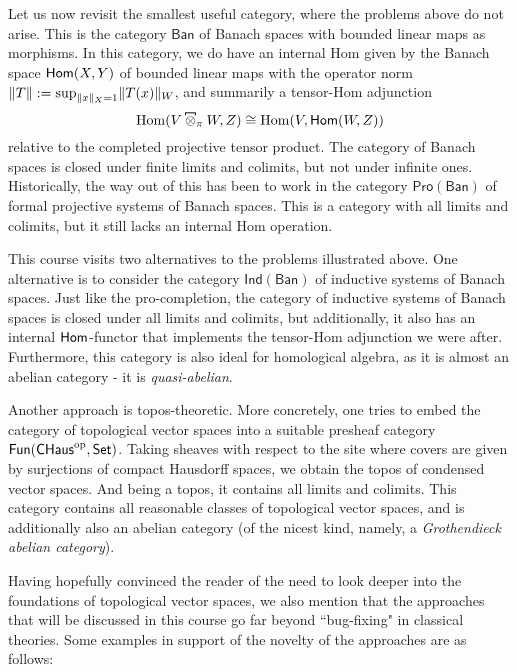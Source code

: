 Let us now revisit the smallest useful category, where the problems above do not arise. This is the category \(\mathsf{Ban}\) of Banach spaces with bounded linear maps as morphisms. In this category, we do have an internal Hom given by the Banach space \(\mathsf{Hom}(X,Y)\) of bounded linear maps with the operator norm \(\lVert T\rVert \mathrel{:=} \sup_{\lVert x\rVert_X = 1} \lVert T(x)\rVert_W\), and summarily a  tensor-Hom adjunction \[\Hom(V \hot_\pi W, Z) \cong \Hom(V, \Home(W,Z))\] relative to the completed projective tensor product. The category of Banach spaces is closed under finite limits and colimits, but not under infinite ones. Historically, the way out of this has been to work in the category \(\mathsf{Pro}(\mathsf{Ban})\) of formal projective systems of Banach spaces. This is a category with all limits and colimits, but it still lacks an internal Hom operation.  


This course visits two alternatives to the problems illustrated above. One alternative is to consider the category \(\mathsf{Ind}(\mathsf{Ban})\) of inductive systems of Banach spaces. Just like the pro-completion, the category of inductive systems of Banach spaces is closed under all limits and colimits, but additionally, it also has an internal \(\mathsf{Hom}\)-functor that implements the tensor-Hom adjunction we were after. Furthermore, this category is also ideal for homological algebra, as it is almost an abelian category - it is \textit{quasi-abelian}.  

Another approach is topos-theoretic. More concretely, one tries to embed the category of topological vector spaces into a suitable presheaf category \(\mathsf{Fun}(\mathsf{CHaus}^{\mathrm{op}}, \mathsf{Set})\). Taking sheaves with respect to the site where covers are given by surjections of compact Hausdorff spaces, we obtain the topos of condensed vector spaces.  And being a topos, it contains all limits and colimits. This category contains all reasonable classes of topological vector spaces, and is additionally also an abelian category (of the nicest kind, namely, a \textit{Grothendieck abelian category}).



Having hopefully convinced the reader of the need to look deeper into the foundations of topological vector spaces, we also mention that the approaches that will be discussed in this course go far beyond ``bug-fixing" in classical theories. Some examples in support of the novelty of the approaches are as follows:

